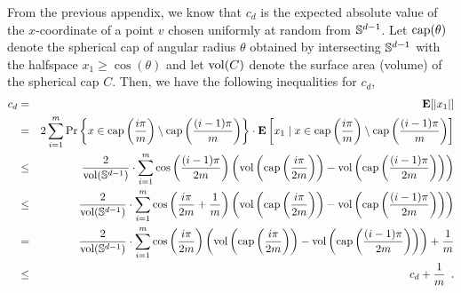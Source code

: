 \documentclass[charterfonts,lotsofwhite]{patmorin}
\newcommand{\E}{\mathbf{E}}
\begin{document}
From the previous appendix, we know that $c_d$ is the expected
absolute value of the $x$-coordinate of a point $v$ chosen uniformly
at random from $\mathbb{S}^{d-1}$.  Let $\mathrm{cap}(\theta)$ denote the spherical cap of
angular radius $\theta$ obtained by intersecting $\mathbb{S}^{d-1}$ with the
halfspace $x_1\ge\cos(\theta)$ and let $\mathrm{vol}(C)$ denote the surface
area (volume) of the spherical cap $C$.  Then, we have the following
inequalities for $c_d$,
\begin{eqnarray*}
   c_d & = & \E[|x_1|] \\ 
   & = & 2\sum_{i=1}^m \Pr\left\{x\in 
             \ccap\left(\frac{i\pi}{m}\right) \setminus
                  \ccap\left(\frac{(i-1)\pi}{m}\right)\right\}\cdot
              \E\left[x_1\mid x\in
              \ccap\left(\frac{i\pi}{m}\right) \setminus
                  \ccap\left(\frac{(i-1)\pi}{m}\right)
              \right] \\
   & \le & \frac{2}{\area(\Sd)}\cdot
                  \sum_{i=1}^m \cos\left(\frac{(i-1)\pi}{2m}\right)
                  \left(\area\left(\ccap\left(\frac{i\pi}{2m}\right)\right)-
                     \area\left(\ccap\left(\frac{(i-1)\pi}{2m}\right)\right)
                  \right) \\
   & \le & \frac{2}{\area(\Sd)}\cdot
                  \sum_{i=1}^m \cos\left(\frac{i\pi}{2m}+\frac{1}{m}\right)
                  \left(\area\left(\ccap\left(\frac{i\pi}{2m}\right)\right)-
                     \area\left(\ccap\left(\frac{(i-1)\pi}{2m}\right)\right)
                  \right) \\
   & = & \frac{2}{\area(\Sd)}\cdot
                  \sum_{i=1}^m \cos\left(\frac{i\pi}{2m}\right)
                  \left(\area\left(\ccap\left(\frac{i\pi}{2m}\right)\right)-
                     \area\left(\ccap\left(\frac{(i-1)\pi}{2m}\right)\right)
                  \right) + \frac{1}{m} \\
   & \le & c_d + \frac{1}{m}  \enspace .
\end{eqnarray*}
\end{document}

